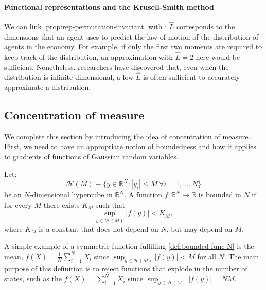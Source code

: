 \documentclass[12pt]{article}
\begin{document}
\paragraph{Functional representations and the Krusell-Smith method}

We can link \cref{prop:rep-permutation-invariant} with \citet{krusell1998income}: $\widehat{L}$ corresponds to the dimensions that an agent uses to predict the law of motion of the distribution of agents in the economy. For example, if only the first two moments are required to keep track of the distribution, an approximation with $\widehat{L}=2$ here would be sufficient. Nonetheless, researchers have discovered that, even when the distribution is infinite-dimensional, a low $\widehat{L}$ is often sufficient to accurately approximate a distribution.

\subsection{Concentration of measure}\label{subsec:concentration}

We complete this section by introducing the idea of concentration of measure. First, we need to have an appropriate notion of boundedness and how it applies to gradients of functions of Gaussian random variables. 
	
\begin{definition}\label{def:bounded-func-N}
Let: 
\begin{equation*}
\mathcal{H}(M) \equiv\{y\in \mathbb{R}^N : |y_i|\leq M ~\forall i=1,...,N\}
\end{equation*}
be an $N$-dimensional hypercube in $\mathbb{R}^N$. A function $f:\mathbb{R}^N\rightarrow \mathbb{R}$ is bounded in $N$ if for every $M$ there exists $K_M$ such that
\begin{equation*}
\sup_{y\in \mathcal{H}(M)} |f(y)| < K_M,
\end{equation*}
where $K_M$ is a constant that does not depend on $N$, but may depend on $M$.
\end{definition}

A simple example of a symmetric function fulfilling \cref{def:bounded-func-N} is the mean, $f(X) = \frac{1}{N}\sum_{i=1}^N X_i$ since $\sup_{y\in \mathcal{H}(M)} |f(y)|  < M$ for all $N$.  The main purpose of this definition is to reject functions that explode in the number of states, such as the $f(X) = \sum_{i=1}^N X_i$ since $\sup_{y\in \mathcal{H}(M)} |f(y)|  = N M$.
\end{document}
